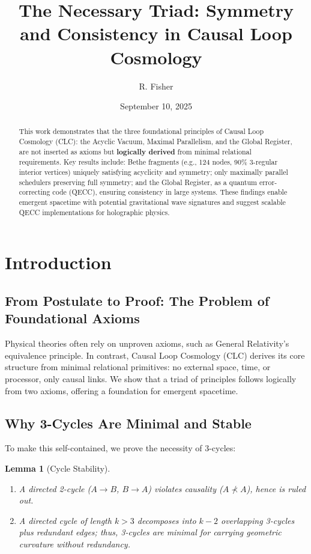 \documentclass[11pt, a4paper]{article}
\title{\textbf{The Necessary Triad: Symmetry and Consistency in Causal Loop Cosmology}}
\author{R. Fisher}
\date{September 10, 2025}
\newtheorem{lemma}{Lemma}[section]
\begin{document}
\maketitle

\begin{abstract}
\noindent This work demonstrates that the three foundational principles of Causal Loop Cosmology (CLC): the Acyclic Vacuum, Maximal Parallelism, and the Global Register, are not inserted as axioms but \textbf{logically derived} from minimal relational requirements. Key results include: Bethe fragments (e.g., 124 nodes, 90\% 3-regular interior vertices) uniquely satisfying acyclicity and symmetry; only maximally parallel schedulers preserving full symmetry; and the Global Register, as a quantum error-correcting code (QECC), ensuring consistency in large systems. These findings enable emergent spacetime with potential gravitational wave signatures and suggest scalable QECC implementations for holographic physics.
\end{abstract}

\tableofcontents

\section{Introduction}

\subsection{From Postulate to Proof: The Problem of Foundational Axioms}
Physical theories often rely on unproven axioms, such as General Relativity’s equivalence principle. In contrast, Causal Loop Cosmology (CLC) derives its core structure from minimal relational primitives: no external space, time, or processor, only causal links. We show that a triad of principles follows logically from two axioms, offering a foundation for emergent spacetime.

\subsection{Why 3-Cycles Are Minimal and Stable}
To make this self-contained, we prove the necessity of 3-cycles:

\begin{lemma}[Cycle Stability]
\label{lem:cycle_stability}
\begin{enumerate}
    \item A directed 2-cycle ($A \to B$, $B \to A$) violates causality ($A \not\prec A$), hence is ruled out.
    \item A directed cycle of length $k > 3$ decomposes into $k-2$ overlapping 3-cycles plus redundant edges; thus, 3-cycles are minimal for carrying geometric curvature without redundancy.
\end{enumerate}
\end{lemma}
\end{document}
